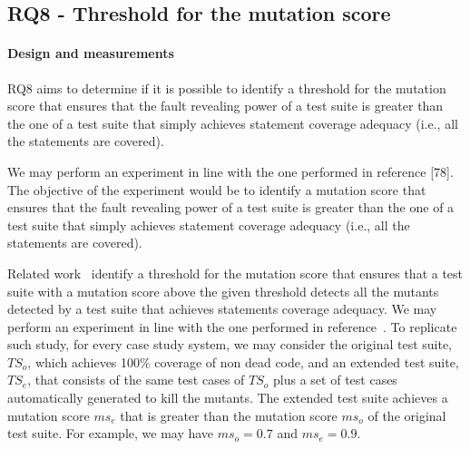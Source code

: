 %
 





\clearpage
\subsection{RQ8 - Threshold for the mutation score}
\label{sec:exp:thr}
\paragraph{Design and measurements}


RQ8 aims to determine if it is possible to identify a threshold for the mutation score that ensures that the fault revealing power of a test suite is greater than the one of a test suite that simply achieves statement coverage adequacy (i.e., all the statements are covered).


We may perform an experiment in line with the one performed in reference [78]. The objective of the experiment would be to identify a mutation score that ensures that the fault revealing power of a test suite is greater than the one of a test suite that simply achieves statement coverage adequacy (i.e., all the statements are covered). 

Related work~\cite{CChekam:17} identify a threshold for the mutation score that ensures that a test suite with a mutation score above the given threshold detects all the mutants detected by a test suite that achieves statements coverage adequacy. 
We may perform an experiment in line with the one performed in reference~\cite{CChekam:17}.
To replicate such study, for every case study system, we may consider the original test suite, $\mathit{TS}_o$, which achieves 100\% coverage of non dead code, and an extended test suite, $\mathit{TS}_e$, that consists of the same test cases of $\mathit{TS}_o$ plus a set of test cases automatically generated to kill the mutants. The extended test suite achieves a mutation score $ms_e$ that is greater than the mutation score $\mathit{ms}_o$ of the original test suite. For example, we may have $\mathit{ms}_o=0.7$ and $\mathit{ms}_e=0.9$.

